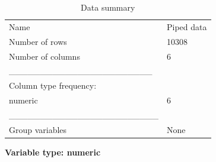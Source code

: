 \documentclass[
  letterpaper,
  DIV=11,
  numbers=noendperiod,
  oneside]{scrreprt}
\begin{document}
\begin{longtable}[]{@{}ll@{}}
\caption{Data summary}\tabularnewline
\toprule()
\endhead
Name & Piped data \\
Number of rows & 10308 \\
Number of columns & 6 \\
\_\_\_\_\_\_\_\_\_\_\_\_\_\_\_\_\_\_\_\_\_\_\_ & \\
Column type frequency: & \\
numeric & 6 \\
\_\_\_\_\_\_\_\_\_\_\_\_\_\_\_\_\_\_\_\_\_\_\_\_ & \\
Group variables & None \\
\bottomrule()
\end{longtable}

\textbf{Variable type: numeric}
\end{document}
